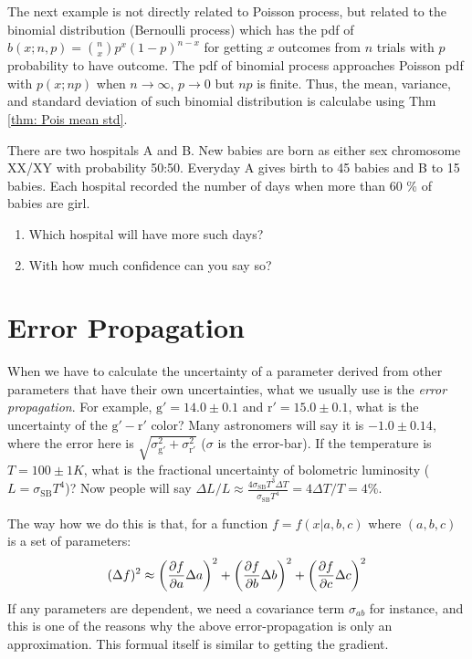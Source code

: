The next example is not directly related to Poisson process, but related to the binomial distribution (Bernoulli process) which has the pdf of $ b(x; n, p) = \binom{n}{x} p^x (1 - p)^{n - x} $ for getting $ x $ outcomes from $ n $ trials with $ p $ probability to have outcome. The pdf of binomial process approaches Poisson pdf with $ p(x; np) $ when $ n \rightarrow \infty $, $ p \rightarrow 0 $ but $ np $ is finite. Thus, the mean, variance, and standard deviation of such binomial distribution is calculabe using Thm \ref{thm: Pois mean std}.
\begin{ex}
There are two hospitals A and B. New babies are born as either sex chromosome XX/XY with probability 50:50. Everyday A gives birth to 45 babies and B to 15 babies. Each hospital recorded the number of days when more than 60 \% of babies are girl.
\begin{enumerate}
\item Which hospital will have more such days?
\item With how much confidence can you say so?
\end{enumerate}
\end{ex}


\section{Error Propagation}
When we have to calculate the uncertainty of a parameter derived from other parameters that have their own uncertainties, what we usually use is the \textit{error propagation}. For example, $ \mathrm{g'} = 14.0 \pm 0.1 $ and $ \mathrm{r'} = 15.0 \pm 0.1 $, what is the uncertainty of the $ \mathrm{g' - r'} $ color? Many astronomers will say it is $ -1.0 \pm 0.14 $, where the error here is $ \sqrt{\sigma_\mathrm{g'}^2 + \sigma_\mathrm{r'}^2} $ ($ \sigma $ is the error-bar). If the temperature is $ T = 100 \pm 1 \si{K} $, what is the fractional uncertainty of bolometric luminosity ($ L = \sigma_\mathrm{SB} T^4 $)? Now people will say $ \Delta L / L \approx \frac{4 \sigma_\mathrm{SB} T^3 \Delta T }{\sigma_\mathrm{SB} T^4} = 4 \Delta T / T = 4 \% $. 

The way how we do this is that, for a function $ f = f(x| a, b, c) $ where $ (a, b, c) $ is a set of parameters:
\begin{equation}\label{eq: error propagation}
  (\Delta f)^2 \approx 
    \qty(\frac{\partial f}{\partial a} \Delta a)^2
    + \qty(\frac{\partial f}{\partial b} \Delta b)^2
    + \qty(\frac{\partial f}{\partial c} \Delta c)^2
\end{equation}
If any parameters are dependent, we need a covariance term $ \sigma_{ab} $ for instance, and this is one of the reasons why the above error-propagation is only an approximation. This formual itself is similar to getting the gradient. 

